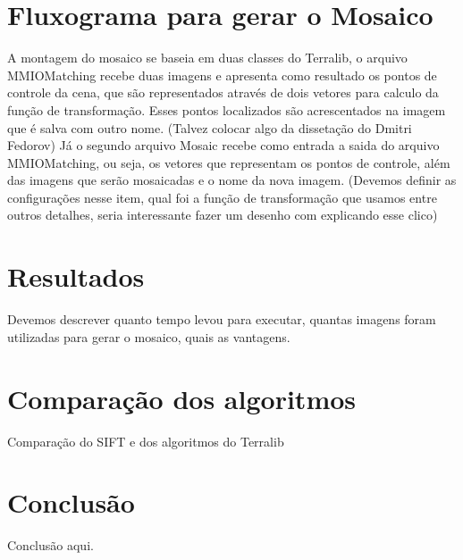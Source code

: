 \documentclass[9pt, a4paper, nofonttune, journal]{IEEEtran}
\begin{document}
\section{ Fluxograma para gerar o Mosaico}
 A montagem do mosaico se baseia em duas classes do Terralib, o arquivo MMIOMatching recebe duas imagens e apresenta como resultado os pontos de controle da cena, que são representados através de dois vetores para calculo da função de transformação. Esses pontos localizados são acrescentados na imagem que é salva com outro nome.
(Talvez colocar algo da dissetação do Dmitri Fedorov)
 Já o segundo arquivo  Mosaic recebe como entrada  a saida do  arquivo MMIOMatching, ou seja, os vetores  que representam os pontos de controle, além das imagens que serão mosaicadas e o nome da nova imagem.
(Devemos definir as configurações nesse item, qual foi a função de transformação que usamos entre outros detalhes, seria interessante fazer um desenho com explicando esse clico)

\section{Resultados}
Devemos descrever quanto tempo levou para executar, quantas imagens foram utilizadas para gerar o mosaico, quais as vantagens. 

\section{Comparação dos algoritmos}
Comparação do SIFT e dos algoritmos do Terralib

\section{Conclusão}
Conclusão aqui.



\end{document}
